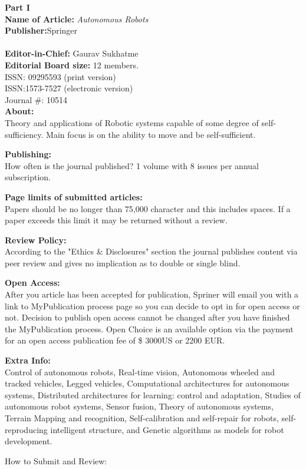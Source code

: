 \documentclass[11pt]{article}
\newcommand\ABIT{\vspace{.10in}\textbf{About: \\}}
\newcommand\PUBLH{\vspace{.10in}\textbf{Publishing: \\ }}
\newcommand\PAGEL{\vspace{.10in}\textbf{Page limits of submitted articles: \\ }}
\newcommand\REVIEW{\vspace{.10in}\textbf{Review Policy: \\ }}
\newcommand\OAS{\vspace{.10in}\textbf{Open Access: \\ }}
\newcommand\EINFO{\vspace{.10in}\textbf{Extra Info:  \\ }}
\newcommand\PARTI{\vspace{.10in}\textbf{Part I \\}}
\begin{document}
\raggedright
\newcommand\NAME{James Vrionis}  %
\newcommand\JAMESID{JVrionis}     %
\newcommand\HWNUM{4}    


\PARTI
\textbf{Name of Article:  }\textit{Autonomous Robots}\\ 
\textbf{Publisher:}Springer \\
 \\
\textbf{Editor-in-Chief:} Gaurav Sukhatme \\
\textbf{Editorial Board size:} 12 members. \\
ISSN: 09295593 (print version) \\
ISSN:1573-7527 (electronic version) \\
Journal \#: 10514 \\

\ABIT 
Theory and applications of Robotic systems capable of some degree of self-sufficiency.
Main focus is on the ability to move and be self-sufficient. 

\PUBLH
How often is the journal published? 
1 volume with 8 issues per annual subscription. 

\PAGEL
Papers should be no longer than 75,000 character and this includes spaces. If a paper exceeds this limit it may be returned without a review. 

\REVIEW
According to the "Ethics \& Disclosures" section the journal publishes content via peer review and gives no implication as to double or single blind. 

\OAS
After you article has been accepted for publication, Spriner will email you with a link to MyPublication process page so you can decide to opt in for open access or not. 
Decision to publish open access cannot be changed after you have finished the MyPublication process. 
Open Choice is an available option via the payment for an open access publication fee of \$ 3000US or 2200 EUR. 

\EINFO
Control of autonomous robots, Real-time vision, Autonomous wheeled and tracked vehicles, Legged vehicles, Computational 
architectures for autonomous systems, Distributed architectures for learning: control and adaptation, 
Studies of autonomous robot systems, Sensor fusion, Theory of autonomous systems,
Terrain Mapping and recognition, Self-calibration and self-repair for robots, 
self-reproducing intelligent structure, and Genetic algorithms as models for robot development. 


How to Submit and Review: \\
\end{document}
